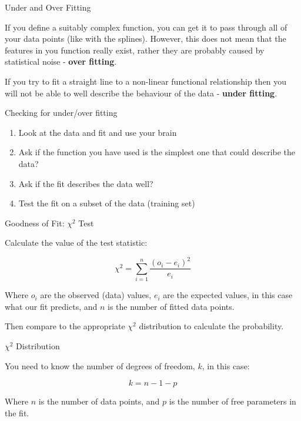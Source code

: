 \documentclass{beamer}
\begin{document}
\begin{frame}{Under and Over Fitting}

If you define a suitably complex function, you can get it to pass through all of your data points (like with the splines).  However, this does not mean that the features in you function really exist, rather they are probably caused by statistical noise - \textbf{over fitting}.

\vspace{5mm}

If you try to fit a straight line to a non-linear functional relationship then you will not be able to well describe the behaviour of the data - \textbf{under fitting}.

\end{frame}


\begin{frame}{Checking for under/over fitting}

\begin{enumerate}
\item Look at the data and fit and use your brain
\item Ask if the function you have used is the simplest one that could describe the data?
\item Ask if the fit describes the data well?
\item Test the fit on a subset of the data (training set)
\end{enumerate}

\end{frame}


\begin{frame}{Goodness of Fit: $\chi^{2}$ Test}

Calculate the value of the test statistic:

\[
\chi^{2} = \sum^{n}_{i=1}\frac{(o_{i} - e_{i})^{2}}{e_{i}}
\]

\vspace{5mm}

Where $o_{i}$ are the observed (data) values, $e_{i}$ are the expected values, in this case what our fit predicts, and $n$ is the number of fitted data points.

\vspace{5mm}

Then compare to the appropriate $\chi^{2}$ distribution to calculate the probability.


\end{frame}



\begin{frame}{$\chi^{2}$ Distribution}

You need to know the number of degrees of freedom, $k$, in this case:

\[
k = n - 1 - p
\]

Where $n$ is the number of data points, and $p$ is the number of free parameters in the fit.



\end{frame}
\end{document}
